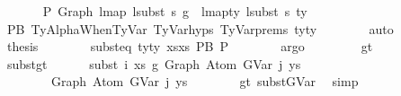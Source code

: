 \begin{isabellebody}
\isanewline
\ \ \ \ \isamarkupfalse%
\ {\isachardoublequoteopen}{\isasymGamma}{}\ {\isasymturnstile}{\isacharbraceleft}{\kern0pt}P{\isacharbraceright}{\kern0pt}\ Graph\ {\isacharparenleft}{\kern0pt}lmap\ {\isacharparenleft}{\kern0pt}lsubst\ s{\isacharparenright}{\kern0pt}\ g{}{\isacharparenright}{\kern0pt}\ {\isacharcolon}{\kern0pt}\ lmap{\isacharunderscore}{\kern0pt}ty\ {\isacharparenleft}{\kern0pt}lsubst\ s{\isacharparenright}{\kern0pt}\ ty{}{\isachardoublequoteclose}\isanewline
\ \ \ \ \ \ \isamarkupfalse%
\ P{}B\ TyAlphaWhenTyVar\ TyVar{\isachardot}{\kern0pt}hyps{\isacharparenleft}{\kern0pt}{}{\isacharcomma}{\kern0pt}{}{\isacharcomma}{\kern0pt}{}{\isacharcomma}{\kern0pt}{}{\isacharcomma}{\kern0pt}{}{\isacharparenright}{\kern0pt}\ TyVar{\isachardot}{\kern0pt}prems{\isacharparenleft}{\kern0pt}{}{\isacharparenright}{\kern0pt}\ ty{\isacharprime}{\kern0pt}{\isacharunderscore}{\kern0pt}ty{}\isanewline
\ \ \ \ \ \ \isamarkupfalse%
\ auto\isanewline
\isanewline
\ \ \ \ \isamarkupfalse%
\ \isamarkupfalse%
\ {\isacharquery}{\kern0pt}thesis\isanewline
\ \ \ \ \ \ \isamarkupfalse%
\ subst{\isacharunderscore}{\kern0pt}eq{\isacharprime}{\kern0pt}\ ty{\isacharprime}{\kern0pt}{\isacharunderscore}{\kern0pt}ty{}\ xs{\isacharprime}{\kern0pt}{\isacharunderscore}{\kern0pt}xs\ P{}B\ P{}\isanewline
\ \ \ \ \ \ \isamarkupfalse%
\ argo\isanewline
\ \ \isamarkupfalse%
\isanewline
\ \ \ \ \isamarkupfalse%
\ gt\ \ \isanewline
\isanewline
\ \ \ \ \isamarkupfalse%
\ subst{\isacharunderscore}{\kern0pt}gt{\isacharcolon}{\kern0pt}\isanewline
\ \ \ \ \ \ {\isachardoublequoteopen}subst\ i\ xs\ g{}\ {\isacharparenleft}{\kern0pt}Graph\ {\isacharparenleft}{\kern0pt}Atom\ {\isacharparenleft}{\kern0pt}GVar\ j{\isacharparenright}{\kern0pt}\ ys{\isacharparenright}{\kern0pt}{\isacharparenright}{\kern0pt}\isanewline
\ \ \ \ \ \ \ {\isacharequal}{\kern0pt}\ Graph\ {\isacharparenleft}{\kern0pt}Atom\ {\isacharparenleft}{\kern0pt}GVar\ j{\isacharparenright}{\kern0pt}\ ys{\isacharparenright}{\kern0pt}{\isachardoublequoteclose}\isanewline
\ \ \ \ \ \ \isamarkupfalse%
\ gt\ subst{\isacharunderscore}{\kern0pt}GVar\ \isamarkupfalse%
\ simp\isanewline
\isanewline
\ \ \ \ \isamarkupfalse%

\end{isabellebody}
